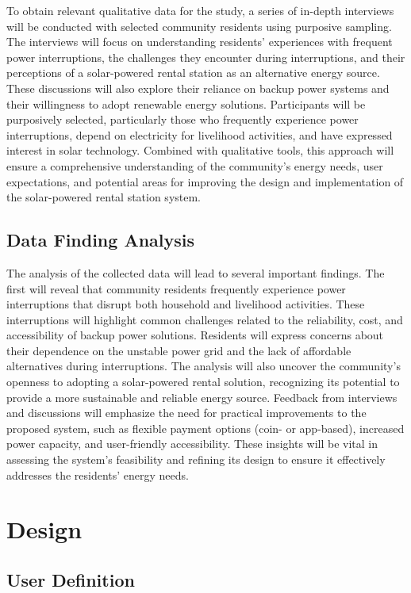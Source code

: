 {To obtain relevant qualitative data for the study, a series of in-depth interviews will be conducted with selected community residents using purposive sampling. The interviews will focus on understanding residents’ experiences with frequent power interruptions, the challenges they encounter during interruptions, and their perceptions of a solar-powered rental station as an alternative energy source. These discussions will also explore their reliance on backup power systems and their willingness to adopt renewable energy solutions. Participants will be purposively selected, particularly those who frequently experience power interruptions, depend on electricity for livelihood activities, and have expressed interest in solar technology. Combined with qualitative tools, this approach will ensure a comprehensive understanding of the community’s energy needs, user expectations, and potential areas for improving the design and implementation of the solar-powered rental station system.

\subsection{Data Finding Analysis}

The analysis of the collected data will lead to several important findings. The first will reveal that community residents frequently experience power interruptions that disrupt both household and livelihood activities. These interruptions will highlight common challenges related to the reliability, cost, and accessibility of backup power solutions. Residents will express concerns about their dependence on the unstable power grid and the lack of affordable alternatives during interruptions. The analysis will also uncover the community’s openness to adopting a solar-powered rental solution, recognizing its potential to provide a more sustainable and reliable energy source. Feedback from interviews and discussions will emphasize the need for practical improvements to the proposed system, such as flexible payment options (coin- or app-based), increased power capacity, and user-friendly accessibility. These insights will be vital in assessing the system’s feasibility and refining its design to ensure it effectively addresses the residents’ energy needs.

\section{Design}
\subsection{User Definition}

}
